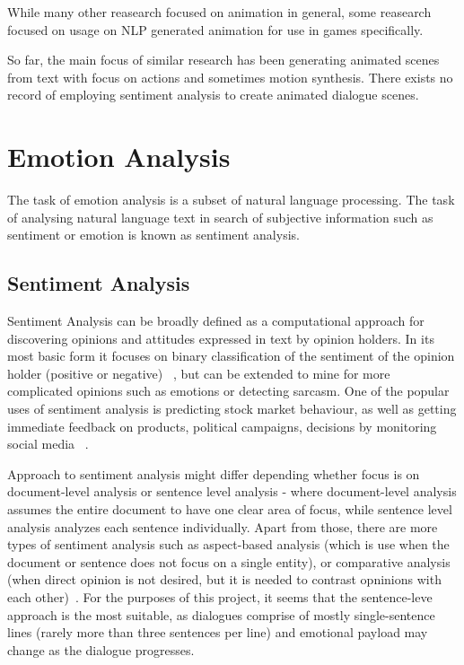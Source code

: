 While many other reasearch focused on animation in general, some reasearch focused on usage on NLP generated animation for use in games specifically.

So far, the main focus of similar research has been generating animated scenes from text with focus on actions and sometimes motion synthesis. There exists no record of employing sentiment analysis to create animated dialogue scenes.




\section{Emotion Analysis}

The task of emotion analysis is a subset of natural language processing. The task of analysing natural language text in search of subjective information such as sentiment or emotion is known as sentiment analysis.

\subsection{Sentiment Analysis}
Sentiment Analysis can be broadly defined as a computational approach for discovering opinions and attitudes expressed in text by opinion holders. In its most basic form it focuses on binary classification of the sentiment of the opinion holder (positive or negative) ~\cite{sentimentanal1}, but can be extended to mine for more complicated opinions such as emotions or detecting sarcasm. One of the popular uses of sentiment analysis is predicting stock market behaviour, as well as getting immediate feedback on products, political campaigns, decisions by monitoring social media ~\cite{sentimentanal2}.

Approach to sentiment analysis might differ depending whether focus is on document-level analysis or sentence level analysis - where document-level analysis assumes the entire document to have one clear area of focus, while sentence level analysis analyzes each sentence individually. Apart from those, there are more types of sentiment analysis such as aspect-based analysis (which is use when the document or sentence does not focus on a single entity), or comparative analysis (when direct opinion is not desired, but it is needed to contrast opninions with each other)~\cite{sentimentanal2}. For the purposes of this project, it seems that the sentence-leve approach is the most suitable, as dialogues comprise of mostly single-sentence lines (rarely more than three sentences per line) and emotional payload may change as the dialogue progresses.

